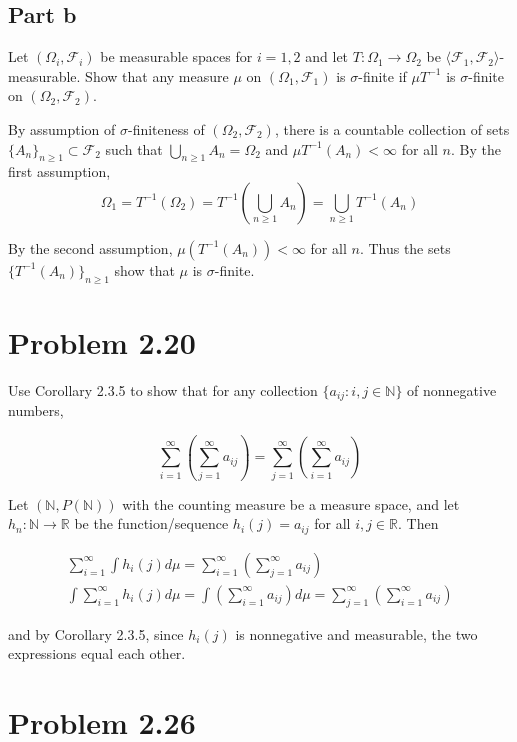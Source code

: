 \documentclass{article}
\newcommand{\R}{\mathbb{R}}
\newcommand{\N}{\mathbb{N}}
\newcommand{\F}{\mathcal{F}}
\begin{document}
\subsection*{Part b}

Let $(\Omega_i, \F_i)$ be measurable spaces for $i = 1, 2$ and let $T: \Omega_1 \rightarrow \Omega_2$ be $\langle \F_1, \F_2 \rangle$-measurable. Show that any measure $\mu$ on $(\Omega_1, \F_1)$ is $\sigma$-finite if $\mu T^{-1}$ is $\sigma$-finite on $(\Omega_2, \F_2)$.

By assumption of $\sigma$-finiteness of $(\Omega_2, \F_2)$, there is a countable collection of sets $\{A_n\}_{n \geq 1} \subset \F_2$ such that $\bigcup_{n \geq 1} A_n = \Omega_2$ and $\mu T^{-1}(A_n) < \infty$ for all $n$. By the first assumption,
\[
\Omega_1 = T^{-1}(\Omega_2) = T^{-1}\left( \bigcup_{n \geq 1} A_n \right) = \bigcup_{n \geq 1} T^{-1}(A_n)
\]

By the second assumption, $\mu(T^{-1}(A_n)) < \infty$ for all $n$. Thus the sets $\{T^{-1}(A_n)\}_{n \geq 1}$ show that $\mu$ is $\sigma$-finite.

\section*{Problem 2.20}

Use Corollary 2.3.5 to show that for any collection $\{a_{ij}: i,j \in \N\}$ of nonnegative numbers,

\[
\sum_{i=1}^\infty \left( \sum_{j=1}^\infty a_{ij} \right) = \sum_{j=1}^\infty \left( \sum_{i=1}^\infty a_{ij} \right)
\]

Let $(\N, P(\N))$ with the counting measure be a measure space, and let $h_n: \N \rightarrow \R$ be the function/sequence $h_i(j) = a_{ij}$ for all $i, j \in \R$. Then

\begin{gather*}
\sum_{i=1}^\infty \int h_i(j) d\mu = \sum_{i=1}^\infty \left( \sum_{j=1}^\infty a_{ij} \right) \\
\int \sum_{i=1}^\infty h_i(j) d\mu = \int \left( \sum_{i=1}^\infty a_{ij} \right) d\mu = \sum_{j=1}^\infty \left( \sum_{i=1}^\infty a_{ij} \right)
\end{gather*}

and by Corollary 2.3.5, since $h_i(j)$ is nonnegative and measurable, the two expressions equal each other.

\section*{Problem 2.26}
\end{document}
